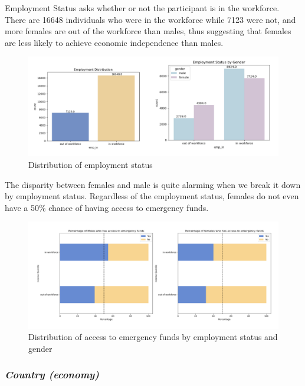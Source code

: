 \documentclass[12pt]{article}
\begin{document}
Employment Status asks whether or not the participant is in the
workforce. There are 16648 individuals who were in the workforce while
7123 were not, and more females are out of the workforce than males,
thus suggesting that females are less likely to achieve economic
independence than males.

\begin{figure}

{\centering \includegraphics[width=1\linewidth]{graphs/employ_graph8} 

}

\caption{Distribution of employment status}\label{fig:unnamed-chunk-11}
\end{figure}

The disparity between females and male is quite alarming when we break
it down by employment status. Regardless of the employment status,
females do not even have a 50\% chance of having access to emergency
funds.

\begin{figure}

{\centering \includegraphics[width=1\linewidth]{graphs/employ_graph9} 

}

\caption{Distribution of access to emergency funds by employment status and gender}\label{fig:unnamed-chunk-12}
\end{figure}

\hypertarget{country-economy}{%
\subsubsection{\texorpdfstring{\emph{Country
(economy)}}{Country (economy)}}\label{country-economy}}
\end{document}
